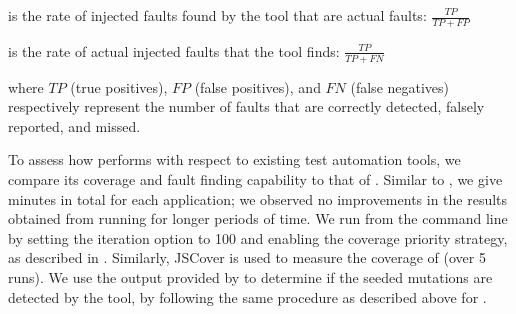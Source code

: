 \begin{description}
\item[Precision] is the rate of injected faults found by the tool that are actual faults: $\frac{\mathit{TP}}{\mathit{TP} + \mathit{FP}}$
\item[Recall] is the rate of actual injected faults that the tool finds: $\frac{\mathit{TP}}{\mathit{TP} + \mathit{FN}}$ 
\end{description}
where $\textit{TP}$ (true positives), $\textit{FP}$ (false positives), and $\textit{FN}$ (false negatives) respectively represent the number of faults that are correctly detected, falsely reported, and missed.

 \label{comparison-setup}
To assess how \jseft performs with respect to existing \javascript test automation tools, we compare its coverage and fault finding capability to that of \artemis \cite{artzi:icse11}.  
Similar to \jseft, we give  minutes in total for each application; we observed no improvements in the results obtained from running \artemis for longer periods of time. 
We run \artemis from the command line by setting the iteration option to 100 and enabling the coverage priority strategy, as described in \cite{artzi:icse11}. %
Similarly, JSCover is used to measure the coverage of \artemis (over 5 runs).
We use the output provided by \artemis to determine if the seeded mutations are detected by the tool, by following the same procedure as described above for \jseft. 




%


  
